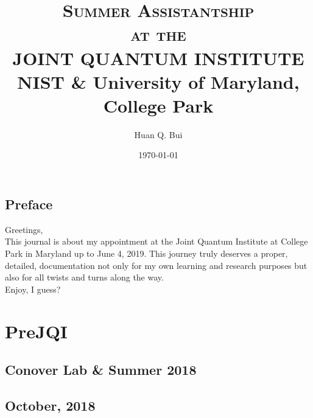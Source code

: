 \documentclass{article}
\theoremstyle{definition}
\begin{document}
	\begin{titlepage}\centering
		\clearpage
		\title{\textsc{\bf{Summer Assistantship\\
			at the\\
		JOINT QUANTUM INSTITUTE}}\\\smallskip NIST \& University of Maryland, College Park\\}
		\author{\bigskip Huan Q. Bui}
		\date{\today}
		\maketitle
		\thispagestyle{empty}
	\end{titlepage}

\newpage

\subsection*{Preface}

Greetings,\\

This journal is about my appointment at the Joint Quantum Institute at College Park in Maryland up to June 4, 2019. This journey truly deserves a proper, detailed, documentation not only for my own learning and research purposes but also for all twists and turns along the way.  \\


Enjoy, I guess?


\newpage
\tableofcontents
\newpage

\section{Pre\textendash JQI}

\subsection{Conover Lab \& Summer 2018}

\subsection{October, 2018}
\end{document}
